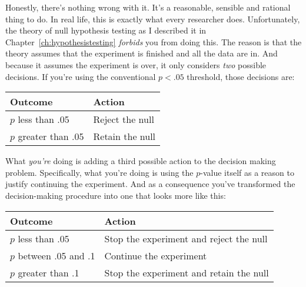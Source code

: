 Honestly, there's nothing wrong with it. It's a reasonable, sensible and rational thing to do. In real life, this is exactly what every researcher does. Unfortunately, the theory of null hypothesis testing as I described it in Chapter~\ref{ch:hypothesistesting} {\it forbids} you from doing this. The reason is that the theory assumes that the experiment is finished and all the data are in. And because it assumes the experiment is over, it only considers {\it two} possible decisions. If you're using the conventional $p<.05$ threshold, those decisions are:

\begin{center}
\begin{tabular}{l|l}
Outcome & Action \\ \hline
$p$ less than .05 & Reject the null \\
$p$ greater than .05 & Retain the null
\end{tabular}
\end{center}

\noindent
What {\it you're} doing is adding a third possible action to the decision making problem. Specifically, what you're doing is using the $p$-value itself as a reason to justify continuing the experiment. And as a consequence you've transformed the decision-making procedure into one that looks more like this:


\begin{center}
\begin{tabular}{l|l}
Outcome & Action \\ \hline
$p$ less than .05 & Stop the experiment and reject the null \\
$p$ between .05 and .1 & Continue the experiment \\
$p$ greater than .1 & Stop the experiment and retain the null
\end{tabular}
\end{center}

